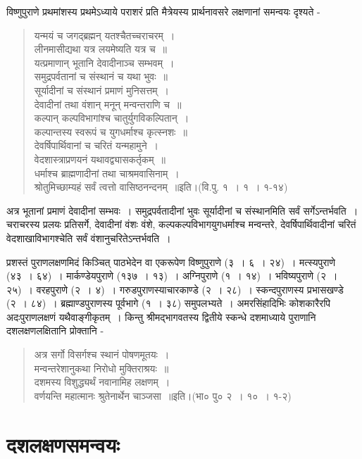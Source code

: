 {विष्णुपुराणे प्रथमांशस्य प्रथमेऽध्याये पराशरं प्रति मैत्रेयस्य प्रार्थनावसरे लक्षणानां समन्वयः दृश्यते -
\begin{verse}
यन्मयं च जगद्ब्रह्मन् यतश्चैतच्चराचरम्~। \\
लीनमासीद्यथा यत्र लयमेष्यति यत्र च~॥\\
यत्प्रमाणान् भूतानि देवादीनाञ्च सम्भवम्~। \\
समुद्रपर्वतानां च संस्थानं च यथा भुवः~॥\\
सूर्यादीनां च संस्थानं प्रमाणं मुनिसत्तम्~। \\
देवादीनां तथा वंशान् मनून् मन्वन्तराणि च~॥\\
कल्पान् कल्पविभागांश्च चातुर्युगविकल्पितान्~। \\
कल्पान्तस्य स्वरूपं च युगधर्माश्च कृत्स्नशः~॥\\
देवर्षिपार्थिवानां च चरितं यन्महामुने~। \\
वेदशास्त्राप्रणयनं यथावद्व्यासकर्तृकम्~॥\\
धर्माश्च ब्राह्मणादीनां तथा चाश्रमवासिनाम्~। \\
श्रोतुमिच्छाम्यहं सर्वं त्वत्तो वासिष्ठनन्दनम्~॥इति।(वि.पु. १~। १~। १-१४)
\end{verse}
अत्र भूतानां प्रमाणं देवादीनां सम्भवः~। समुद्रपर्वतादीनां भुवः सूर्यादीनां च संस्थानमिति सर्वं सर्गेऽन्तर्भवति~। चराचरस्य प्रलयः प्रतिसर्गे, देवादीनां वंशः वंशे, कल्पकल्पविभागयुगधर्माश्च मन्वन्तरे, देवर्षिपार्थिवादीनां चरितं वेदशाखाविभागश्चेति सर्वं वंशानुचरितेऽन्तर्भवति~। 

प्रशस्तं पुराणलक्षणमिदं किञ्चित् पाठभेदेन वा एकरूपेण विष्णुपुराणे (३~। ६~। २४)~। मत्स्यपुराणे (४३~। ६४)~। मार्कण्डेयपुराणे (१३७~। १३)~। अग्निपुराणे (१~। १४)~। भविष्यपुराणे (२~। २५)~। वरहपुराणे (२~। ४)~। गरुडपुराणस्याचारकाण्डे (२~। २८)~। स्कन्दपुराणस्य प्रभासखण्डे (२~। ८४)~। ब्रह्माण्डपुराणस्य पूर्वभागे (१~। ३८) समुपलभ्यते~। अमरसिंहादिभिः कोशकारैरपि अदःपुराणलक्षणं यथैवाङ्गीकृतम्~। किन्तु श्रीमद्भागवतस्य द्वितीये स्कन्धे दशमाध्याये पुराणानि दशलक्षणलक्षितानि प्रोक्तानि -
\begin{verse}
अत्र सर्गो विसर्गश्च स्थानं पोषणमूतयः~। \\
मन्वन्तरेशानुकथा निरोधो मुक्तिराश्रयः~॥\\
दशमस्य विशुद्ध्यर्थं नवानामिह लक्षणम्~। \\
वर्णयन्ति महात्मानः श्रुतेनार्थेन चाञ्जसा~॥इति।(भा० पु० २~। १०~। १-२)
\end{verse}
\section*{दशलक्षणसमन्वयः}

}
